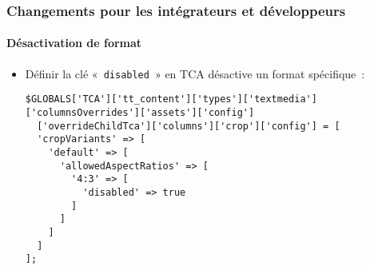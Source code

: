 %

\begin{frame}[fragile]
	\frametitle{Changements pour les intégrateurs et développeurs}
	\framesubtitle{Désactivation de format}


	\begin{itemize}
		\item Définir la clé «~\texttt{disabled}~» en TCA désactive
			un format spécifique~:
\begin{lstlisting}
$GLOBALS['TCA']['tt_content']['types']['textmedia']['columnsOverrides']['assets']['config']
  ['overrideChildTca']['columns']['crop']['config'] = [
  'cropVariants' => [
    'default' => [
      'allowedAspectRatios' => [
        '4:3' => [
          'disabled' => true
        ]
      ]
    ]
  ]
];
\end{lstlisting}

	\end{itemize}

\end{frame}

